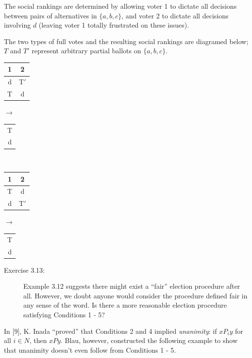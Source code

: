 \documentclass{article}
\begin{document}
The social rankings are determined by allowing voter 1 to dictate all decisions between pairs of alternatives in $\{a, b, c\}$, and voter 2 to dictate all decisions involving $d$ (leaving voter 1 totally frustrated on these issues).

The two types of full votes and the resulting social rankings are diagramed below; $T$ and $T'$ represent arbitrary partial ballots on $\{ a, b, c \}$. 

\begin{center}
\begin{tabular}{c|c}
  1 & 2 \\
  \hline
  d & T$'$ \\
  T & d \\
\end{tabular}
$\rightarrow$ 
\begin{tabular}{c}
  \\
  T \\
  d \\
\end{tabular}
$\ \ \ \ $
\begin{tabular}{c|c}
  1 & 2 \\
  \hline
  T & d \\
  d & T$'$ \\
\end{tabular}
$\rightarrow$
\begin{tabular}{c}
  \\
  T \\
  d \\
\end{tabular}
\end{center}

\begin{description}

\item[Exercise 3.13:] Example 3.12 suggests there might exist a ``fair'' election procedure after all. However, we doubt anyone would consider the procedure defined fair in any sense of the word. Is there a more reasonable election procedure satisfying Conditions 1 - 5?

\end{description}

In [9], K. Inada ``proved'' that Conditions 2 and 4 implied \emph{unanimity}: if $xP_{i}y$ for all $i \in N$, then $xPy$. Blau, however, constructed the following example to show that unanimity doesn't even follow from Conditions 1 - 5.
\end{document}
